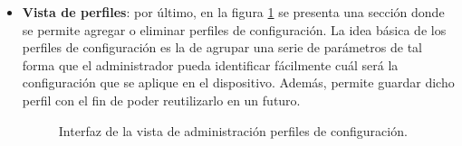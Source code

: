 \begin{itemize}
    \item \textbf{Vista de perfiles}: por último, en la figura \ref{fig:captura_web_topo} se presenta una sección donde se permite agregar o eliminar perfiles de configuración. La idea básica de los perfiles de configuración es la de agrupar una serie de parámetros de tal forma que el administrador pueda identificar fácilmente cuál será la configuración que se aplique en el dispositivo. Además, permite guardar dicho perfil con el fin de poder reutilizarlo en un futuro. 

    \begin{figure}[H]
        \centering
        \caption{Interfaz de la vista de administración perfiles de configuración.}
        \label{fig:captura_web_topo}
      \end{figure}
    
\end{itemize}



